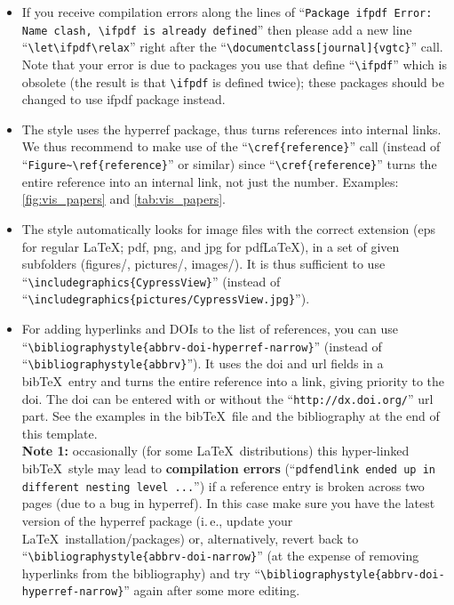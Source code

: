 \documentclass[review]{vgtc}                 %
\begin{document}
\begin{itemize}
\item If you receive compilation errors along the lines of ``\texttt{Package ifpdf Error: Name clash, \textbackslash ifpdf is already defined}'' then please add a new line ``\texttt{\textbackslash let\textbackslash ifpdf\textbackslash relax}'' right after the ``\texttt{\textbackslash documentclass[journal]\{vgtc\}}'' call. Note that your error is due to packages you use that define ``\texttt{\textbackslash ifpdf}'' which is obsolete (the result is that \texttt{\textbackslash ifpdf} is defined twice); these packages should be changed to use ifpdf package instead.
\item The style uses the hyperref package, thus turns references into internal links. We thus recommend to make use of the ``\texttt{\textbackslash cref\{reference\}}'' call (instead of ``\texttt{Figure\~{}\textbackslash ref\{reference\}}'' or similar) since ``\texttt{\textbackslash cref\{reference\}}'' turns the entire reference into an internal link, not just the number. Examples: \cref{fig:vis_papers} and \cref{tab:vis_papers}.
\item The style automatically looks for image files with the correct extension (eps for regular \LaTeX; pdf, png, and jpg for pdf\LaTeX), in a set of given subfolders (figures/, pictures/, images/). It is thus sufficient to use ``\texttt{\textbackslash includegraphics\{CypressView\}}'' (instead of ``\texttt{\textbackslash includegraphics\{pictures/CypressView.jpg\}}'').
\item For adding hyperlinks and DOIs to the list of references, you can use ``\texttt{\textbackslash bibliographystyle\{abbrv-doi-hyperref-narrow\}}'' (instead of ``\texttt{\textbackslash bibliographystyle\{abbrv\}}''). It uses the doi and url fields in a bib\TeX\ entry and turns the entire reference into a link, giving priority to the doi. The doi can be entered with or without the ``\texttt{http://dx.doi.org/}'' url part. See the examples in the bib\TeX\ file and the bibliography at the end of this template.\\[1em]
\textbf{Note 1:} occasionally (for some \LaTeX\ distributions) this hyper-linked bib\TeX\ style may lead to \textbf{compilation errors} (``\texttt{pdfendlink ended up in different nesting level ...}'') if a reference entry is broken across two pages (due to a bug in hyperref). In this case make sure you have the latest version of the hyperref package (i.\,e., update your \LaTeX\ installation/packages) or, alternatively, revert back to ``\texttt{\textbackslash bibliographystyle\{abbrv-doi-narrow\}}'' (at the expense of removing hyperlinks from the bibliography) and try ``\texttt{\textbackslash bibliographystyle\{abbrv-doi-hyperref-narrow\}}'' again after some more editing.\\[1em]

\end{itemize}
\end{document}
